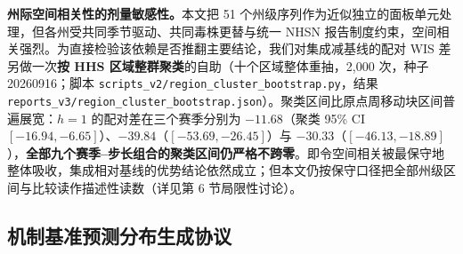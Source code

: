 \documentclass[11pt,a4paper]{article}
\theoremstyle{plain}
\theoremstyle{definition}
\begin{document}
\noindent\textbf{州际空间相关性的剂量敏感性。}本文把 51 个州级序列作为近似独立的面板单元处理，但各州受共同季节驱动、共同毒株更替与统一 NHSN 报告制度约束，空间相关强烈。为直接检验该依赖是否推翻主要结论，我们对集成减基线的配对 WIS 差另做一次\textbf{按 HHS 区域整群聚类}的自助（十个区域整体重抽，2,000 次，种子 20260916；脚本 \texttt{scripts\_v2/region\_cluster\_bootstrap.py}，结果 \texttt{reports\_v3/region\_cluster\_bootstrap.json}）。聚类区间比原点周移动块区间普遍展宽：$h=1$ 的配对差在三个赛季分别为 $-11.68$（聚类 95\% CI $[-16.94, -6.65]$）、$-39.84$（$[-53.69, -26.45]$）与 $-30.33$（$[-46.13, -18.89]$），\textbf{全部九个赛季--步长组合的聚类区间仍严格不跨零}。即令空间相关被最保守地整体吸收，集成相对基线的优势结论依然成立；但本文仍按保守口径把全部州级区间与比较读作描述性读数（详见第 6 节局限性讨论）。

\subsection{机制基准预测分布生成协议}\label{sec:mech_predictor_protocol}
\end{document}
